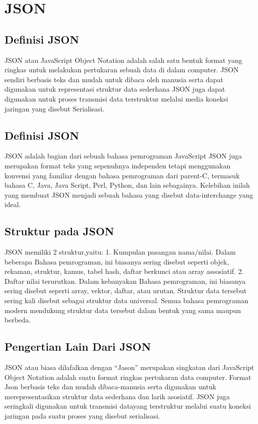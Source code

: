 \documentclass[a4paper]{article}
\begin{document}
\section{JSON}
\subsection{Definisi JSON}
JSON atau JavaScript Object Notation adalah salah satu bentuk format yang ringkas untuk melakukan pertukaran sebuah data di dalam computer. JSON sendiri berbasis teks dan mudah untuk dibaca oleh manusia serta dapat digunakan untuk representasi struktur data sederhana JSON juga dapat digunakan untuk proses transmisi data terstruktur melalui media koneksi jaringan yang disebut Serialisasi.
\subsection{Definisi JSON}
JSON  adalah  bagian  dari  sebuah bahasa  pemrograman  JavaScript  JSON juga merupakan format teks yang sepenuhnya independen tetapi menggunakan konvensi yang  familiar  dengan  bahasa  pemrograman  dari  parent-C,  termasuk  bahasa C,  Java,  Java Script,  Perl, Python,  dan lain sebagainya.  Kelebihan  inilah  yang  membuat  JSON  menjadi  sebuah  bahasa yang disebut  data-interchange yang ideal.
\subsection{Struktur pada JSON}
JSON memiliki 2 struktur,yaitu:
1.	Kumpulan pasangan nama/nilai.
Dalam beberapa Bahasa pemrograman, ini biasanya sering disebut seperti objek, rekaman, struktur, kamus, tabel hash, daftar berkunci atau array assosiatif.
2.	Daftar nilai terurutkan.
Dalam kebanyakan Bahasa pemrograman, ini biasanya sering disebut seperti array, vektor, daftar, atau urutan.
Struktur data tersebut sering kali disebut sebagai struktur data universal. Semua bahasa pemrograman modern mendukung struktur data tersebut dalam bentuk yang sama maupun berbeda.
\subsection{Pengertian Lain Dari JSON}
JSON atau biasa dilafalkan dengan “Jason” merupakan singkatan dari JavaScript Object Notation adalah suatu format ringkas pertukaran data computer. Format Json berbasis teks dan mudah dibaca-manusia serta digunakan untuk merepresentasikan struktur data sederhana dan larik asosiatif. JSON juga seringkali digunakan untuk transmisi datayang  terstruktur melalui suatu koneksi jaringan pada suatu proses yang disebut serialisasi.
\end{document}
